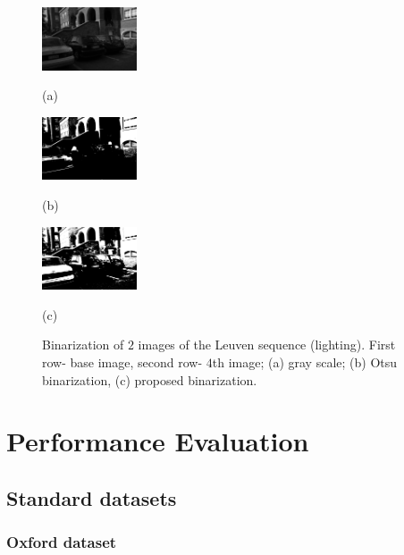\documentclass{article}
\begin{document}
\begin{figure}[htb]
\begin{minipage}[b]{.3\linewidth}
  \centering
  \centerline{\includegraphics[width=2.8cm]{./Figs/leuven4}}
   \centerline{(a)}\medskip
\end{minipage}
\hfill
\begin{minipage}[b]{0.3\linewidth}
  \centering
  \centerline{\includegraphics[width=2.8cm]{./Figs/leuven4_otsu}}
   \centerline{(b)}\medskip
\end{minipage}
\hfill
\begin{minipage}[b]{0.3\linewidth}
  \centering
  \centerline{\includegraphics[width=2.8cm]{./Figs/leuven4_numcc}}
   \centerline{(c)}\medskip
\end{minipage}

 \vspace{-0.2cm}
\caption{Binarization of $2$ images of the Leuven sequence (lighting). First row- base image, second row- $4$th image; (a) gray scale; (b) Otsu binarization, (c) proposed binarization.}
\label{fig:leuven_bin}
%
\end{figure}

\section{Performance  Evaluation}
\label{sec:perf}

\subsection{Standard datasets}
\label{ssec:standart}

\subsubsection{Oxford dataset}
\label{sssec:oxford}
\end{document}
